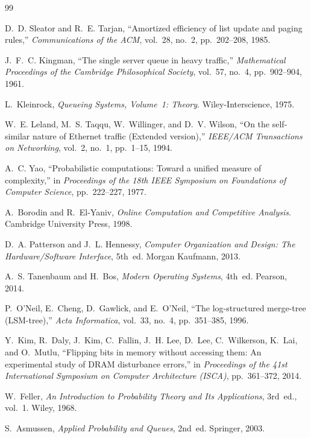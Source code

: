 ﻿\documentclass[12pt, a4paper]{article}
\begin{document}
\begin{thebibliography}{99}

D.~D. Sleator and R.~E. Tarjan,
``Amortized efficiency of list update and paging rules,''
\textit{Communications of the ACM}, vol.~28, no.~2, pp.~202--208, 1985.

J.~F.~C. Kingman,
``The single server queue in heavy traffic,''
\textit{Mathematical Proceedings of the Cambridge Philosophical Society},
vol.~57, no.~4, pp.~902--904, 1961.

L.~Kleinrock,
\textit{Queueing Systems, Volume~1: Theory}.
Wiley-Interscience, 1975.

W.~E. Leland, M.~S. Taqqu, W.~Willinger, and D.~V. Wilson,
``On the self-similar nature of Ethernet traffic (Extended version),''
\textit{IEEE/ACM Transactions on Networking}, vol.~2, no.~1, pp.~1--15, 1994.

A.~C. Yao,
``Probabilistic computations: Toward a unified measure of complexity,''
in \textit{Proceedings of the 18th IEEE Symposium on Foundations of Computer Science},
pp.~222--227, 1977.

A.~Borodin and R.~El-Yaniv,
\textit{Online Computation and Competitive Analysis}.
Cambridge University Press, 1998.

D.~A. Patterson and J.~L. Hennessy,
\textit{Computer Organization and Design: The Hardware/Software Interface},
5th~ed. Morgan Kaufmann, 2013.

A.~S. Tanenbaum and H.~Bos,
\textit{Modern Operating Systems}, 4th~ed.
Pearson, 2014.

P.~O'Neil, E.~Cheng, D.~Gawlick, and E.~O'Neil,
``The log-structured merge-tree (LSM-tree),''
\textit{Acta Informatica}, vol.~33, no.~4, pp.~351--385, 1996.

Y.~Kim, R.~Daly, J.~Kim, C.~Fallin, J.~H. Lee, D.~Lee, C.~Wilkerson,
K.~Lai, and O.~Mutlu,
``Flipping bits in memory without accessing them: An experimental study of
DRAM disturbance errors,''
in \textit{Proceedings of the 41st International Symposium on Computer
Architecture (ISCA)}, pp.~361--372, 2014.

W.~Feller,
\textit{An Introduction to Probability Theory and Its Applications}, 3rd~ed., vol.~1.
Wiley, 1968.

S.~Asmussen,
\textit{Applied Probability and Queues}, 2nd~ed.
Springer, 2003.

\end{thebibliography}
\end{document}
